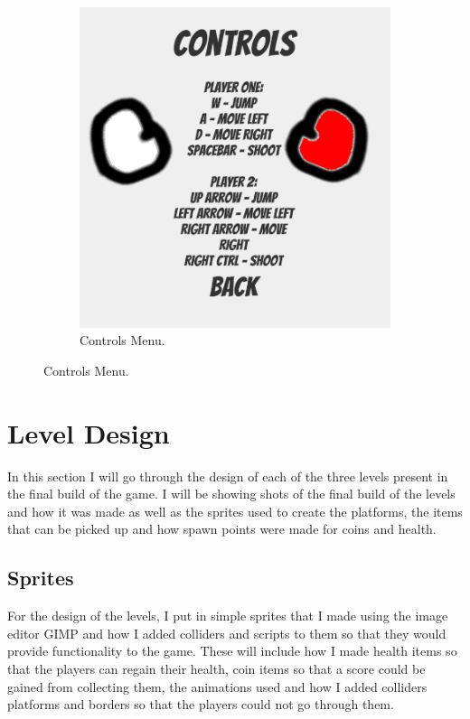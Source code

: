 \begin{figure}[h]
\begin{subfigure}{.5\textwidth}
  \includegraphics[width= 0.8\linewidth]{Images/Controls.PNG}
  \caption{Controls Menu.}
  \label{fig:Controls}
  \end{subfigure}%
\end{figure}
\newpage

\section{Level Design}
In this section I will go through the design of each of the three levels present in the final build of the game. I will be showing shots of the final build of the levels and how it was made as well as the sprites used to create the platforms, the items that can be picked up and how spawn points were made for coins and health.

\subsection{Sprites}
For the design of the levels, I put in simple sprites that I made using the image editor GIMP and how I added colliders and scripts to them so that they would provide functionality to the game. These will include how I made health items so that the players can regain their health, coin items so that a score could be gained from collecting them, the animations used and how I added colliders platforms and borders so that the players could not go through them.

